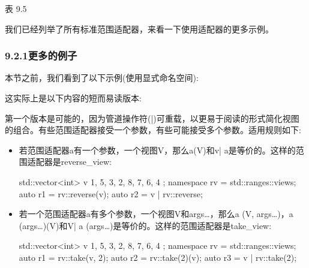 \begin{center}
表 9.5
\end{center}

我们已经列举了所有标准范围适配器，来看一下使用适配器的更多示例。

\subsubsection{9.2.1\hspace{0.2cm}更多的例子}

本节之前，我们看到了以下示例(使用显式命名空间):


这实际上是以下内容的短而易读版本:


第一个版本是可能的，因为管道操作符(|)可重载，以更易于阅读的形式简化视图的组合。有些范围适配器接受一个参数，有些可能接受多个参数。适用规则如下:

\begin{itemize}
\item
若范围适配器a有一个参数，一个视图V，那么a(V)和v| a是等价的。这样的范围适配器是reverse\_view:

\begin{cpp}
std::vector<int> v{ 1, 5, 3, 2, 8, 7, 6, 4 };
namespace rv = std::ranges::views;
auto r1 = rv::reverse(v);
auto r2 = v | rv::reverse;
\end{cpp}

\item
若一个范围适配器a有多个参数，一个视图V和args…，那么a (V, args…)，a (args…)(V)和V| a (args…)是等价的。这样的范围适配器是take\_view:

\begin{cpp}
std::vector<int> v{ 1, 5, 3, 2, 8, 7, 6, 4 };
namespace rv = std::ranges::views;
auto r1 = rv::take(v, 2);
auto r2 = rv::take(2)(v);
auto r3 = v | rv::take(2);
\end{cpp}

\end{itemize}


